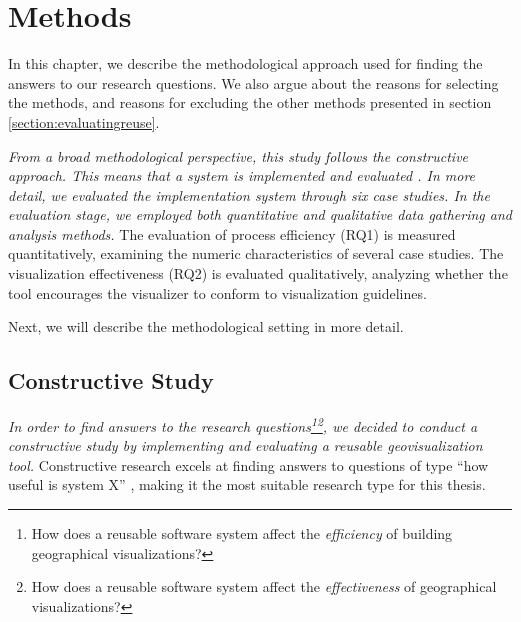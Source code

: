 
\chapter{Methods}
\label{chapter:methods}

In this chapter, we describe the methodological approach used for finding the answers to our research questions. We also argue about the reasons for selecting the methods, and reasons for excluding the other methods presented in section \ref{section:evaluatingreuse}. 

\emph{From a broad methodological perspective, this study follows the constructive approach. This means that a system is implemented and evaluated \citep{jarvinen_tutkimustyon_2012}. In more detail, we evaluated the implementation system through six case studies. In the evaluation stage, we employed both quantitative and qualitative data gathering and analysis  methods.} The evaluation of process efficiency (RQ1) is measured quantitatively, examining the numeric characteristics of several case studies. The visualization effectiveness (RQ2) is evaluated qualitatively, analyzing whether the tool encourages the visualizer to conform to visualization guidelines.

Next, we will describe the methodological setting in more detail.

\section{Constructive Study}

\emph{In order to find answers to the research questions\footnote{How does a reusable software system affect the \emph{efficiency} of building geographical visualizations?}\footnote{How does a reusable software system affect the \emph{effectiveness} of geographical visualizations?}, we decided to conduct a constructive study by implementing and evaluating a reusable geovisualization tool.} Constructive research excels at finding answers to questions of type ``how useful is system X'' \citep{jarvinen_tutkimustyon_2012}, making it the most suitable research type for this thesis.

